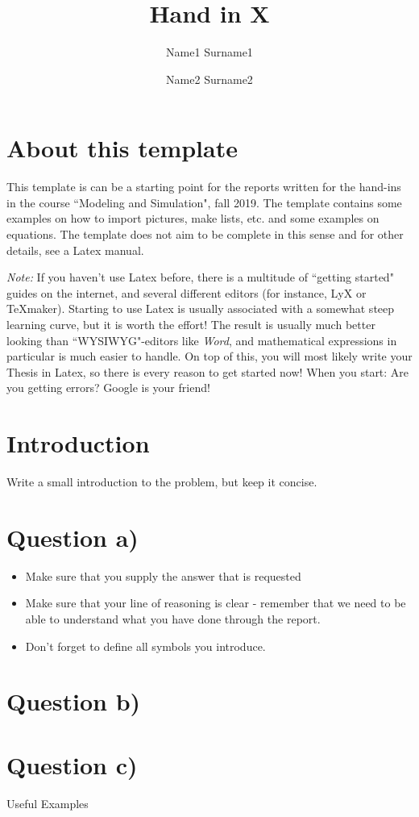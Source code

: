 \documentclass[11pt]{article}
\title{Hand in X}
\author{Name1 Surname1 \and Name2 Surname2 }
\begin{document}
\maketitle
\section*{About this template}
This template is can  be a starting point for the reports written for the hand-ins in the course ``Modeling and Simulation", fall 2019. The template contains some examples on how to import pictures, make lists, etc. and some examples on equations. The template does not aim to be complete in this sense and for other details, see a Latex manual.

\emph{Note:} If you haven't use Latex before, there is a multitude of ``getting started" guides on the internet, and several different editors (for instance, LyX or TeXmaker). Starting to use Latex  is usually associated with a somewhat steep learning curve, but it is worth the effort! The result is usually much better looking than ``WYSIWYG"-editors like \emph{Word}, and mathematical expressions in particular is much easier to handle. On top of this, you will most likely write your Thesis in Latex, so there is every reason to get started now! When you start: Are you getting errors? Google is your friend!
\newpage
\section{Introduction}
Write a small introduction to the problem, but keep it concise.
\section{Question a)}
\begin{itemize}
\item Make sure that you supply the answer that is requested
\item Make sure that your line of reasoning is clear  - remember that we need to be able to understand what you have done through the report.
\item Don't forget to define all symbols you introduce.
\end{itemize}
\section{Question b)}
\section{Question c)}
\newpage
\begin{center}
{\huge Useful Examples}
\end{center}
\end{document}
